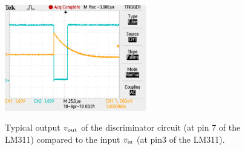 \documentclass[12pt]{article}
\begin{document}
\begin{figure}[htbp]
\begin{center}
{\includegraphics[width=0.55\textwidth]{figs/discrim.pdf}}
\end{center}
\caption{\label{fig:typout} Typical output $v_{\rm out}$ of the discriminator circuit (at pin 7 of the LM311) compared to the input $v_{\rm in}$ (at pin3 of the LM311).}
\end{figure}
\end{document}
